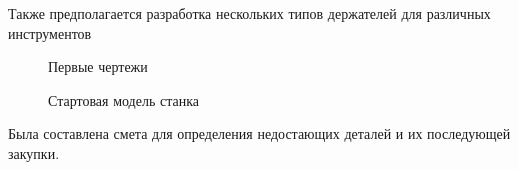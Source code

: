 \documentclass[a4paper,12pt]{article}
\theoremstyle{plain}                          %
\theoremstyle{definition}                     %
\theoremstyle{remark}                         %
\begin{document}
Также предполагается разработка нескольких типов держателей для различных инструментов

\begin{figure}[H]
\end{figure}

\begin{figure}[H]
    \caption{Первые чертежи}
\end{figure}


\begin{figure}[H]
    \caption{Стартовая модель станка}
\end{figure}

\newpage

Была составлена смета для определения недостающих деталей и их последующей закупки.
\end{document}

